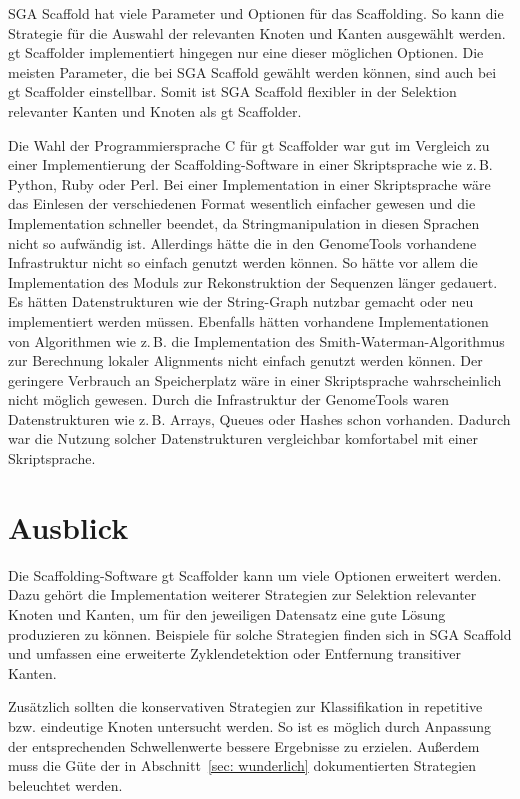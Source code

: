 \documentclass[a4paper,11pt,parskip]{scrartcl}
\begin{document}

SGA Scaffold hat viele Parameter und Optionen für das Scaffolding. So
kann die Strategie für die Auswahl der relevanten Knoten und Kanten
ausgewählt werden. gt Scaffolder implementiert hingegen nur eine
dieser möglichen Optionen. Die meisten Parameter, die bei SGA Scaffold
gewählt werden können, sind auch bei gt Scaffolder einstellbar. Somit
ist SGA Scaffold flexibler in der Selektion relevanter Kanten und
Knoten als gt Scaffolder.

Die Wahl der Programmiersprache C für gt Scaffolder war gut im
Vergleich zu einer Implementierung der Scaffolding-Software in einer
Skriptsprache wie z.\,B. Python, Ruby oder Perl. Bei einer
Implementation in einer Skriptsprache wäre das Einlesen der
verschiedenen Format wesentlich einfacher gewesen und die
Implementation schneller beendet, da Stringmanipulation in diesen
Sprachen nicht so aufwändig ist. Allerdings hätte die in den
GenomeTools vorhandene Infrastruktur nicht so einfach genutzt werden
können. So hätte vor allem die Implementation des Moduls zur
Rekonstruktion der Sequenzen länger gedauert. Es hätten
Datenstrukturen wie der String-Graph nutzbar gemacht oder neu
implementiert werden müssen. Ebenfalls hätten vorhandene
Implementationen von Algorithmen wie z.\,B. die Implementation des
Smith-Waterman-Algorithmus zur Berechnung lokaler Alignments nicht
einfach genutzt werden können. Der geringere Verbrauch an
Speicherplatz wäre in einer Skriptsprache wahrscheinlich nicht möglich
gewesen. Durch die Infrastruktur der GenomeTools waren Datenstrukturen
wie z.\,B. Arrays, Queues oder Hashes schon vorhanden. Dadurch war die
Nutzung solcher Datenstrukturen vergleichbar komfortabel mit einer
Skriptsprache.

\section{Ausblick}
\label{sec: Ausblick}

Die Scaffolding-Software gt Scaffolder kann um viele Optionen
erweitert werden. Dazu gehört die Implementation weiterer Strategien
zur Selektion relevanter Knoten und Kanten, um für den jeweiligen
Datensatz eine gute Lösung produzieren zu können. Beispiele für
solche Strategien finden sich in SGA Scaffold und umfassen eine
erweiterte Zyklendetektion oder Entfernung transitiver Kanten.

Zusätzlich sollten die konservativen Strategien zur Klassifikation in
repetitive bzw. eindeutige Knoten untersucht werden. So ist es möglich
durch Anpassung der entsprechenden Schwellenwerte bessere Ergebnisse zu
erzielen. Außerdem muss die Güte der in Abschnitt~\ref{sec: wunderlich}
dokumentierten Strategien beleuchtet werden.
\end{document}
